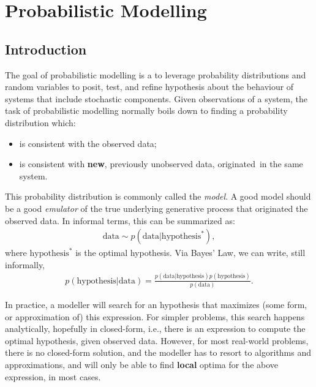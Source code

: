 \chapter{Probabilistic Modelling}
\label{chapter:probmodel}

\section{Introduction}
\label{section:probmodelintro}
The goal of probabilistic modelling is a to leverage probability distributions
and random variables to posit, test, and refine hypothesis about the behaviour of
systems that include stochastic components. Given observations of a system, the
task of probabilistic modelling normally boils down to finding a probability
distribution which:
\begin{itemize}
    \item is consistent with the observed data;
    \item is consistent with \textbf{new}, previously unobserved data, originated\
        in the same system.
\end{itemize}

This probability distribution is commonly called the \emph{model}. A good model
should be a good \emph{emulator} of the true underlying generative process that originated
the observed data. In informal terms, this can be summarized as:
\begin{align}
    \mbox{data} \sim p(\mbox{data}|\mbox{hypothesis}^*),
\end{align} where $\text{hypothesis}^*$ is the optimal hypothesis. Via Bayes' Law,
we can write, still informally,
\begin{align}
    p(\mbox{hypothesis}|\mbox{data}) = \frac{p(\mbox{data}|\mbox{hypothesis})p(\mbox{hypothesis})}{p(\mbox{data})} \label{eq:bayes}.
\end{align}

In practice, a modeller will search for an hypothesis that maximizes (some form,
or approximation of) this expression. For simpler problems, this search happens
analytically, hopefully in closed-form, i.e., there is an expression to compute the optimal hypothesis,
given observed data. However, for most real-world problems, there is no closed-form solution,
and the modeller has to resort to algorithms and approximations, and will only
be able to find \textbf{local} optima for the above expression, in most cases.

